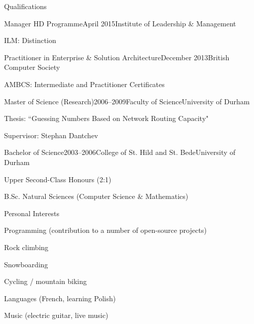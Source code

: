 \documentclass{cv}
\begin{document}
\begin{rSection}{Qualifications}

\begin{rSubsection}{Manager HD Programme}{April 2015}{Institute of Leadership \& Management}{}
\item ILM: Distinction
\end{rSubsection}

\begin{rSubsection}{Practitioner in Enterprise \& Solution Architecture}{December 2013}{British Computer Society}{}
\item AMBCS: Intermediate and Practitioner Certificates
\end{rSubsection}

\begin{rSubsection}{Master of Science (Research)}{2006--2009}{Faculty of Science}{University of Durham}
\item Thesis: ``Guessing Numbers Based on Network Routing Capacity"
\item Supervisor: Stephan Dantchev
\end{rSubsection}

\begin{rSubsection}{Bachelor of Science}{2003--2006}{College of St. Hild and St. Bede}{University of Durham}
\item Upper Second-Class Honours (2:1)
\item B.Sc. Natural Sciences (Computer Science \& Mathematics)
\end{rSubsection}

\end{rSection}


\begin{rSection}{Personal Interests}

\begin{rSubsection}{}{}{}{}
\item Programming (contribution to a number of open-source projects)
\item Rock climbing
\item Snowboarding
\item Cycling / mountain biking
\item Languages (French, learning Polish)
\item Music (electric guitar, live music)
\end{rSubsection}

\end{rSection}
\end{document}
